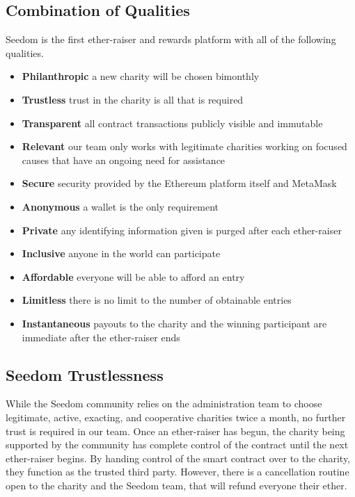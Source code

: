 \documentclass[11pt]{article}
\begin{document}
\subsection{Combination of Qualities}

Seedom is the first ether-raiser and rewards platform with all of the following qualities.

\begin{itemize}
\item{\textbf{Philanthropic} a new charity will be chosen bimonthly}
\item{\textbf{Trustless} trust in the charity is all that is required}
\item{\textbf{Transparent} all contract transactions publicly visible and immutable}
\item{\textbf{Relevant} our team only works with legitimate charities working on focused causes that have an ongoing need for assistance}
\item{\textbf{Secure} security provided by the Ethereum platform itself and MetaMask}
\item{\textbf{Anonymous} a wallet is the only requirement}
\item{\textbf{Private} any identifying information given is purged after each ether-raiser}
\item{\textbf{Inclusive} anyone in the world can participate}
\item{\textbf{Affordable} everyone will be able to afford an entry}
\item{\textbf{Limitless} there is no limit to the number of obtainable entries}
\item{\textbf{Instantaneous} payouts to the charity and the winning participant are immediate after the ether-raiser ends}
\end{itemize}

\subsection{Seedom Trustlessness}

While the Seedom community relies on the administration team to choose legitimate, active, exacting, and cooperative charities twice a month, no further trust is required in our team. Once an ether-raiser has begun, the charity being supported by the community has complete control of the contract until the next ether-raiser begins. By handing control of the smart contract over to the charity, they function as the trusted third party. However, there is a cancellation routine open to the charity and the Seedom team, that will refund everyone their ether.
\end{document}

